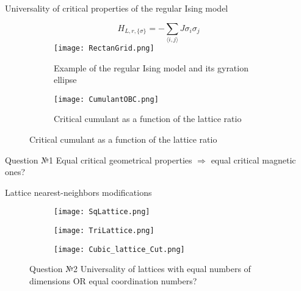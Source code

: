 \documentclass{beamer}
\begin{document}
\begin{frame}{Universality of critical properties of the regular Ising model}
\begin{figure}
\centering
\begin{subfigure}{0.45\textwidth}
\begin{equation}\label{H_Ising_Rectan}
  H_{L, r, \{\sigma\}} = - \sum_{\langle i,j \rangle} J  \sigma_{i}  \sigma_{j}
\end{equation}
\texttt{[image: RectanGrid.png]}
\caption{Example of the regular Ising model and its gyration ellipse}
\end{subfigure}
\hfill
\begin{subfigure}{0.45\textwidth}
\texttt{[image: CumulantOBC.png]}
\caption{Critical cumulant as a function of the lattice ratio \cite{Selke2006}}
\end{subfigure}
\end{figure}

\begin{alertblock}{Question №1}
Equal critical geometrical properties $\Rightarrow$ equal critical magnetic ones?
\end{alertblock}
\end{frame}

\begin{frame}{Lattice nearest-neighbors modifications}

\begin{figure}[t]
\centering
\begin{subfigure}{0.34\textwidth}
\centering
\texttt{[image: SqLattice.png]}
\end{subfigure}
\hfill
\begin{subfigure}{0.34\textwidth}
\centering
\texttt{[image: TriLattice.png]}
\end{subfigure}
\hfill
\begin{subfigure}{0.3\textwidth}
\centering
\texttt{[image: Cubic\_lattice\_Cut.png]}
\end{subfigure}

\begin{alertblock}{Question №2}
Universality of lattices with equal numbers of dimensions OR equal coordination numbers? 
\end{alertblock}
\end{figure}

\end{frame}
\end{document}
